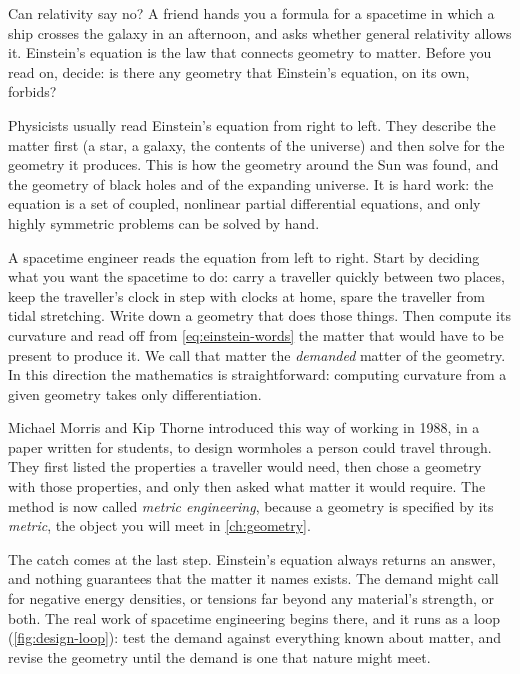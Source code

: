 \begin{thought}{Can relativity say no?}
A friend hands you a formula for a spacetime in which a ship crosses the
galaxy in an afternoon, and asks whether general relativity allows it.
Einstein's equation is the law that connects geometry to matter. Before you
read on, decide: is there any geometry that Einstein's equation, on its own,
forbids?
\end{thought}

Physicists usually read Einstein's equation from right to left. They describe
the matter first (a star, a galaxy, the contents of the universe) and then
solve for the geometry it produces. This is how the geometry around the Sun
was found, and the geometry of black holes and of the expanding universe. It
is hard work: the equation is a set of coupled, nonlinear partial differential
equations, and only highly symmetric problems can be solved by hand.

A spacetime engineer reads the equation from left to right. Start by deciding
what you want the spacetime to do: carry a traveller quickly between two
places, keep the traveller's clock in step with clocks at home, spare the
traveller from tidal stretching. Write down a geometry that does those things.
Then compute its curvature and read off from \cref{eq:einstein-words} the
matter that would have to be present to produce it. We call that matter the
\emph{demanded} matter of the geometry. In this direction the mathematics is
straightforward: computing curvature from a given geometry takes only
differentiation.

Michael Morris and Kip Thorne introduced this way of working in 1988, in a
paper written for students, to design wormholes a person could travel
through. They first listed the properties a traveller would need, then chose
a geometry with those properties, and only then asked what matter it would
require. The method is now called \emph{metric engineering}, because a
geometry is specified by its \emph{metric}, the object you will meet in
\cref{ch:geometry}.

The catch comes at the last step. Einstein's equation always returns an
answer, and nothing guarantees that the matter it names exists. The demand
might call for negative energy densities, or tensions far beyond any
material's strength, or both. The real work of spacetime engineering begins
there, and it runs as a loop (\cref{fig:design-loop}): test the demand
against everything known about matter, and revise the geometry until the
demand is one that nature might meet.

